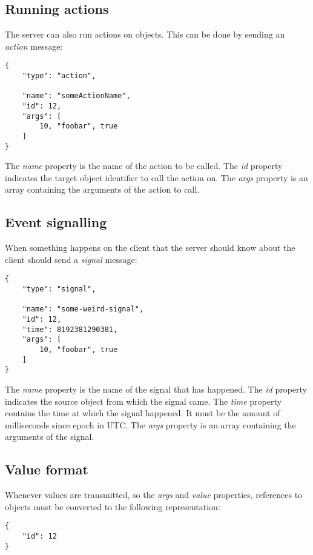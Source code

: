 \documentclass[11pt,a4paper]{article}
\begin{document}
\subsection{Running actions}

The server can also run actions on objects.
This can be done by sending an \textit{action} message:

\begin{verbatim}
{
    "type": "action",

    "name": "someActionName",
    "id": 12,
    "args": [
        10, "foobar", true
    ]
}
\end{verbatim}

The \textit{name} property is the name of the action to be called.
The \textit{id} property indicates the target object identifier to call the action on.
The \textit{args} property is an array containing the arguments of the action to call.

\subsection{Event signalling}

When something happens on the client that the server should know about the client should send a \textit{signal} message:

\begin{verbatim}
{
    "type": "signal",

    "name": "some-weird-signal",
    "id": 12,
    "time": 8192381290381,
    "args": [
        10, "foobar", true
    ]
}
\end{verbatim}

The \textit{name} property is the name of the signal that has happened.
The \textit{id} property indicates the source object from which the signal came.
The \textit{time} property contains the time at which the signal happened.
It must be the amount of milliseconds since epoch in UTC.
The \textit{args} property is an array containing the arguments of the signal.

\subsection{Value format}

Whenever values are transmitted, so the \textit{args} and \textit{value} properties, references to objects must be converted to the following representation:

\begin{verbatim}
{
    "id": 12
}
\end{verbatim}
\end{document}
